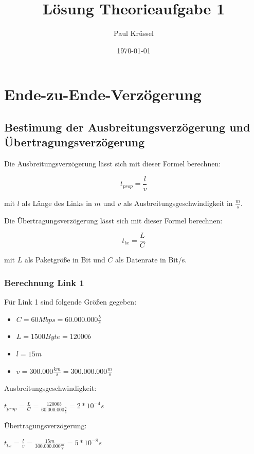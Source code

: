 \documentclass{kdiartcl}
\institute{Fachbereich Angewandte Informatik}
\date{\today}
\author{Paul Krüssel}
\title{Lösung Theorieaufgabe 1}
\begin{document}
\maketitle

\section{Ende-zu-Ende-Verzögerung}

\subsection{Bestimung der Ausbreitungsverzögerung und Übertragungsverzögerung}

Die Ausbreitungsverzögerung lässt sich mit dieser Formel berechnen:

\[
t_{prop} = \frac{l}{v}
\]

mit \( l \) als Länge des Links in $m$ und \( v \) als Ausbreitungsgeschwindigkeit in \( \frac{m}{s} \).


Die Übertragungsverzögerung lässt sich mit dieser Formel berechnen:

\[
    t_{tx} = \frac{L}{C}
\]
    
mit \( L \) als Paketgröße in Bit und \( C \) als Datenrate in Bit/s.
    
\subsubsection{Berechnung Link 1}
    Für Link 1 sind folgende Größen gegeben: \\
    \begin{itemize}
        \item $C = 60 Mbps = 60.000.000 \frac{b}{s}$
        \item $L = 1500 Byte = 12000 b$
        \item $l = 15m$
        \item $v = 300.000 \frac{km}{s} = 300.000.000 \frac{m}{s}$
    \end{itemize}
    Ausbreitungsgeschwindigkeit: \\
    \begin{center}
        $t_{prop} = \frac{L}{C} = \frac{12000 b}{60.000.000 \frac{b}{s}} = 2 * 10^{-4}s$
    \end{center}
    Übertragungsverzögerung: \\
    \begin{center}
        $t_{tx} = \frac{l}{v} = \frac{15m}{300.000.000\frac{m}{s}} = 5 * 10^{-8}s$
    \end{center}
\end{document}

